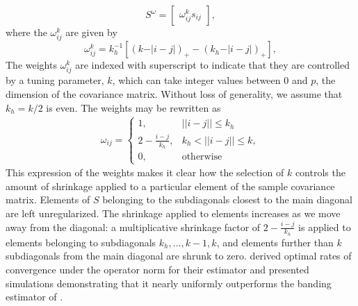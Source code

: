 \begin{equation} \label{eq:cai-tapering-estimator}
S^{\omega} =  \begin{bmatrix} \omega_{ij}^k s_{ij} \end{bmatrix},
\end{equation}
\noindent
where the $\omega_{ij}^k$ are given by 
\begin{equation*}
\omega^k_{ij} = k_h^{-1} \left[ \left( k - \vert i-j\vert\right)_+ - \left(k_h - \vert i-j\vert\right)_+ \right],
\end{equation*}
\noindent
The weights $\omega^k_{ij}$ are indexed with superscript to indicate that they  are controlled by a tuning parameter, $k$,  which can take integer values between 0 and $p$, the dimension of the covariance matrix.  Without loss of generality,  we assume that $k_h = k/2$ is even. The weights may be rewritten as
\begin{align*}
\omega_{ij} = \left\{\begin{array}{ll} 1, & \vert \vert i -j \vert \vert \le k_h \\
                             2 - \frac{i - j}{k_h}, & k_h < \vert \vert i -j \vert \vert \le k, \\
                             0, & \mbox{otherwise}  \end{array} \right.
\end{align*}
\noindent
This expression of the weights makes it clear how the selection of $k$ controls the amount of shrinkage applied to a particular element of the sample covariance matrix. Elements of $S$ belonging to the subdiagonals closest to the main diagonal are left unregularized. The shrinkage applied to elements increases as we move away from the diagonal: a multiplicative shrinkage factor of $2 - \frac{i - j}{k_h}$ is applied to elements belonging to subdiagonals $k_h,\dots,k-1,k$, and elements further than $k$ subdiagonals from the main diagonal are shrunk to zero. \cite{cai2010optimal} derived optimal rates of convergence under the operator norm for their estimator and presented simulations demonstrating that it nearly uniformly outperforms the banding estimator of \cite{bickel2008regularized}.  


\bigskip



